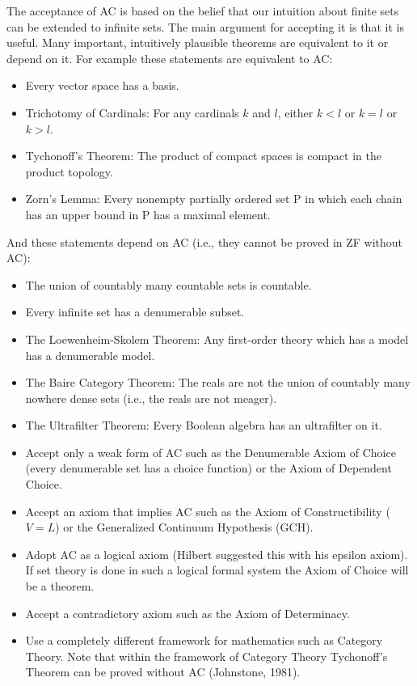 The acceptance of AC is based on the belief that our intuition about finite
sets can be extended to infinite sets.  The main argument for accepting it
is that it is useful.  Many important, intuitively plausible theorems are
equivalent to it or depend on it.  For example these statements are equivalent
to AC:
\begin{itemize}
\item Every vector space has a basis.
\item Trichotomy of Cardinals: For any cardinals $k$ and $l$, either $k<l$ or $k=l$ or $k>l$.
\item Tychonoff's Theorem: The product of compact spaces is compact in the
  product topology.
\item Zorn's Lemma: Every nonempty partially ordered set P in which each
  chain has an upper bound in P has a maximal element.
\end{itemize}
And these statements depend on AC (i.e., they cannot be proved in ZF
without AC):
\begin{itemize}
\item The union of countably many countable sets is countable.
\item Every infinite set has a denumerable subset.
\item The Loewenheim-Skolem Theorem: Any first-order theory which has a model
  has a denumerable model.
\item The Baire Category Theorem: The reals are not the union of countably
  many nowhere dense sets (i.e., the reals are not meager).
\item The Ultrafilter Theorem: Every Boolean algebra has an ultrafilter on it.
\end{itemize}


\begin{itemize}
\item Accept only a weak form of AC such as the Denumerable Axiom of Choice
  (every denumerable set has a choice function) or the Axiom of Dependent
  Choice.
\item Accept an axiom that implies AC such as the Axiom of Constructibility
  ($V=L$) or the Generalized Continuum Hypothesis (GCH).
\item Adopt AC as a logical axiom (Hilbert suggested this with his epsilon
  axiom).  If set theory is done in such a logical formal system the
  Axiom of Choice will be a theorem.
\item Accept a contradictory axiom such as the Axiom of Determinacy.
\item Use a completely different framework for mathematics such as
  Category Theory.  Note that within the framework of Category Theory
  Tychonoff's Theorem can be proved without AC (Johnstone, 1981).
\end{itemize}

